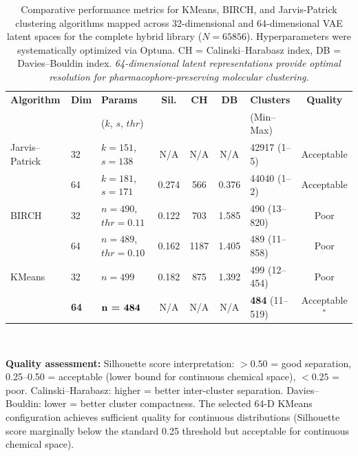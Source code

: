 \documentclass[journal=jcisd8,manuscript=suppinfo]{achemso}
\begin{document}
\begin{table}[htbp]
\centering
\caption{Comparative performance metrics for KMeans, BIRCH, and Jarvis-Patrick clustering algorithms mapped across \num{32}-dimensional and \num{64}-dimensional VAE latent spaces for the complete hybrid library ($N = \num{65856}$). Hyperparameters were systematically optimized via Optuna. CH = Calinski--Harabasz index, DB = Davies--Bouldin index. \textit{64-dimensional latent representations provide optimal resolution for pharmacophore-preserving molecular clustering.}}
\label{tab:clustering_comparison}
\renewcommand{\arraystretch}{1.2}
\small
\begin{tabular}{@{}l l l c c c l c@{}}
\toprule
\textbf{Algorithm} & \textbf{Dim} & \textbf{Params} & \textbf{Sil.} & \textbf{CH} & \textbf{DB} & \textbf{Clusters} & \textbf{Quality} \\
& & ($k$, $s$, $thr$) & & & & (Min--Max) & \\
\midrule
Jarvis--Patrick & \num{32} & $k = \num{151}$, $s = \num{138}$ & N/A & N/A & N/A & \num{42917} (\numrange{1}{5}) & Acceptable \\
& \num{64} & $k = \num{181}$, $s = \num{171}$ & \num{0.274} & \num{566} & \num{0.376} & \num{44040} (\numrange{1}{2}) & Acceptable \\
\midrule
BIRCH & \num{32} & $n = \num{490}$, $thr = \num{0.11}$ & \num{0.122} & \num{703} & \num{1.585} & \num{490} (\numrange{13}{820}) & Poor \\
& \num{64} & $n = \num{489}$, $thr = \num{0.10}$ & \num{0.162} & \num{1187} & \num{1.405} & \num{489} (\numrange{11}{858}) & Poor \\
\midrule
KMeans & \num{32} & $n = \num{499}$ & \num{0.182} & \num{875} & \num{1.392} & \num{499} (\numrange{12}{454}) & Poor \\
& \textbf{\num{64}} & $\textbf{n = \num{484}}$ & N/A & N/A & N/A & \textbf{\num{484}} (\numrange{11}{519}) & Acceptable$^*$ \\
\bottomrule
\end{tabular}
\vspace{0.3em}\\
\begin{footnotesize}
\textbf{Quality assessment:} Silhouette score interpretation: $>0.50$ = good separation,
\numrange{0.25}{0.50} = acceptable (lower bound for continuous chemical space), $<0.25$ = poor.
Calinski--Harabasz: higher = better inter-cluster separation.
Davies--Bouldin: lower = better cluster compactness.
The selected \num{64}-D KMeans configuration achieves sufficient quality for continuous distributions
(Silhouette score marginally below the standard \num{0.25} threshold but acceptable for continuous chemical space).
\end{footnotesize}
\end{table}
\end{document}
